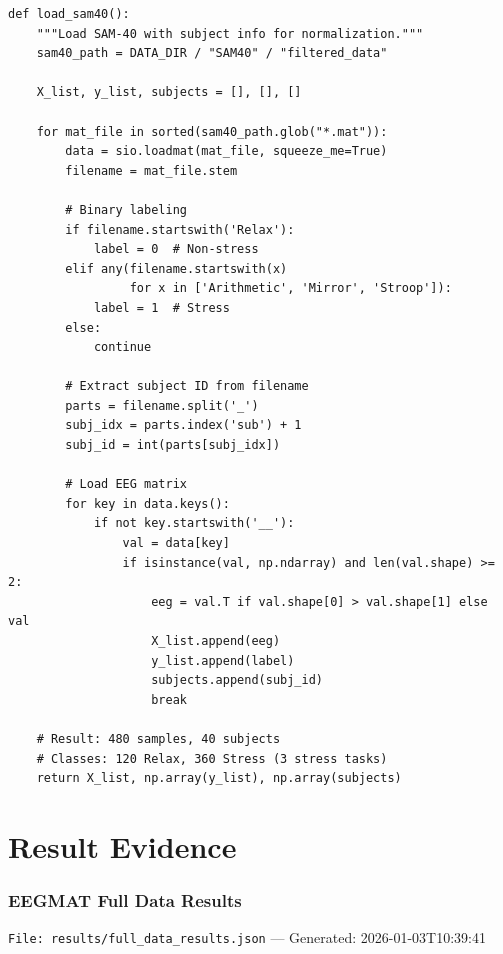 \documentclass[11pt,a4paper]{article}
\begin{document}
\begin{lstlisting}[caption={Loading 480 MAT files from SAM-40 dataset}]
def load_sam40():
    """Load SAM-40 with subject info for normalization."""
    sam40_path = DATA_DIR / "SAM40" / "filtered_data"

    X_list, y_list, subjects = [], [], []

    for mat_file in sorted(sam40_path.glob("*.mat")):
        data = sio.loadmat(mat_file, squeeze_me=True)
        filename = mat_file.stem

        # Binary labeling
        if filename.startswith('Relax'):
            label = 0  # Non-stress
        elif any(filename.startswith(x)
                 for x in ['Arithmetic', 'Mirror', 'Stroop']):
            label = 1  # Stress
        else:
            continue

        # Extract subject ID from filename
        parts = filename.split('_')
        subj_idx = parts.index('sub') + 1
        subj_id = int(parts[subj_idx])

        # Load EEG matrix
        for key in data.keys():
            if not key.startswith('__'):
                val = data[key]
                if isinstance(val, np.ndarray) and len(val.shape) >= 2:
                    eeg = val.T if val.shape[0] > val.shape[1] else val
                    X_list.append(eeg)
                    y_list.append(label)
                    subjects.append(subj_id)
                    break

    # Result: 480 samples, 40 subjects
    # Classes: 120 Relax, 360 Stress (3 stress tasks)
    return X_list, np.array(y_list), np.array(subjects)
\end{lstlisting}

\newpage

\part{Result Evidence}

\section{EEGMAT Full Data Results}
\texttt{File: results/full\_data\_results.json} --- Generated: 2026-01-03T10:39:41
\end{document}
